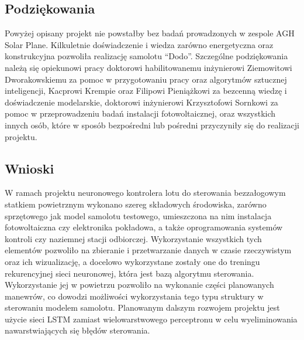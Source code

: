 \documentclass[12pt, a4paper]{article}
\begin{document}
\subsection{Podziękowania}
Powyżej opisany projekt nie powstałby bez badań prowadzonych w zespole AGH Solar Plane. Kilkuletnie doświadczenie i wiedza zarówno energetyczna oraz konstrukcyjna pozwoliła realizację samolotu ``Dodo''. Szczególne podziękowania należą się opiekunowi pracy doktorowi habilitowanemu inżynierowi Ziemowitowi Dworakowskiemu za pomoc w przygotowaniu pracy oraz algorytmów sztucznej inteligencji, Kacprowi Krempie oraz Filipowi Pieniążkowi za bezcenną wiedzę i doświadczenie modelarskie, doktorowi inżynierowi Krzysztofowi Sornkowi za pomoc w przeprowadzeniu badań instalacji fotowoltaicznej, oraz wszystkich innych osób, które w sposób bezpośredni lub pośredni przyczyniły się do realizacji projektu.


\subsection{Wnioski}
W ramach projektu neuronowego kontrolera lotu do sterowania bezzałogowym statkiem powietrznym wykonano szereg składowych środowiska, zarówno sprzętowego jak model samolotu testowego, umieszczona na nim instalacja fotowoltaiczna czy elektronika pokładowa, a także oprogramowania systemów kontroli czy naziemnej stacji odbiorczej. Wykorzystanie wszystkich tych elementów pozwoliło na zbieranie i przetwarzanie danych w czasie rzeczywistym oraz ich wizualizację, a docelowo wykorzystane zostały one do treningu rekurencyjnej sieci neuronowej, która jest bazą algorytmu sterowania. Wykorzystanie jej w powietrzu pozwoliło na wykonanie części planowanych manewrów, co dowodzi możliwości wykorzystania tego typu struktury w sterowaniu modelem samolotu. Planowanym dalszym rozwojem projektu jest użycie sieci LSTM zamiast wielowarstwowego perceptronu w celu wyeliminowania nawarstwiających się błędów sterowania.
\end{document}
